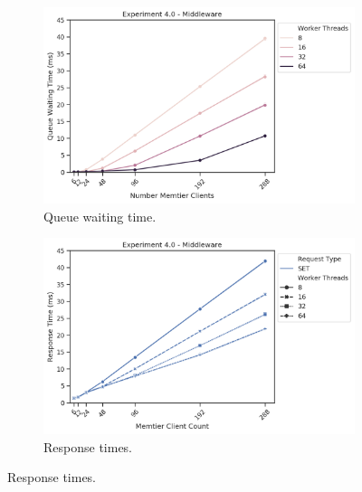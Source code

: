 \begin{figure}
{\begin{subfigure}[t!]{0.55\textwidth}
                \centering
                \includegraphics[width=1\textwidth]{../data_analysis/figures/4-0_mw_queue-wait-time.png}
                \caption{Queue waiting time.\label{fig:sets_mw_qwt}}
            \end{subfigure}
            \begin{subfigure}[t!]{0.55\textwidth}
                \centering
                \includegraphics[width=1\textwidth]{../data_analysis/figures/4-0_mw_response_time.png}
                \caption{Response times.\label{fig:sets_mw_rt}}
            \end{subfigure}
            }
\end{figure}

